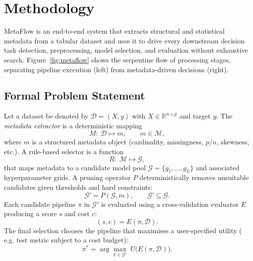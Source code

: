 \documentclass[runningheads]{llncs}
\begin{document}
\section{Methodology}
\label{sec:methodology}

MetaFlow is an end-to-end system that extracts structural and statistical
metadata from a tabular dataset and uses it to drive every downstream
decision   task detection, preprocessing, model selection, and evaluation  
without exhaustive search. Figure~\ref{fig:metaflow} shows the serpentine flow of processing stages, separating pipeline execution (left) from metadata-driven decisions (right).

\subsection{Formal Problem Statement}

Let a dataset be denoted by $\mathcal{D}=(X,y)$ with $X\in\mathbb{R}^{n\times p}$
and target $y$.  The \emph{metadata extractor} is a deterministic mapping
\begin{equation}
  M:\;\mathcal{D} \mapsto m,\qquad m\in\mathcal{M},
\end{equation}
where $m$ is a structured metadata object (cardinality, missingness, $p/n$,
skewness, etc.).  A rule-based selector is a function
\begin{equation}
  R:\;\mathcal{M} \mapsto \mathcal{G},
\end{equation}
that maps metadata to a candidate model pool $\mathcal{G}=\{g_1,\dots,g_L\}$ and
associated hyperparameter grids.  A pruning operator $P$ deterministically
removes unsuitable candidates given thresholds and hard constraints:
\begin{equation}
  \mathcal{G}' = P(\mathcal{G}, m),\qquad \mathcal{G}'\subseteq\mathcal{G}.
\end{equation}
Each candidate pipeline $\pi$ in $\mathcal{G}'$ is evaluated using a
cross-validation evaluator $E$ producing a score $s$ and cost $c$:
\begin{equation}
  (s,c) = E(\pi,\mathcal{D}).
\end{equation}
The final selection chooses the pipeline that maximises a user-specified utility
($\,$e.g. test metric subject to a cost budget):
\begin{equation}
  \pi^* = \arg\max_{\pi\in\mathcal{G}'}\; U\big(E(\pi,\mathcal{D})\big).
\end{equation}
\end{document}
